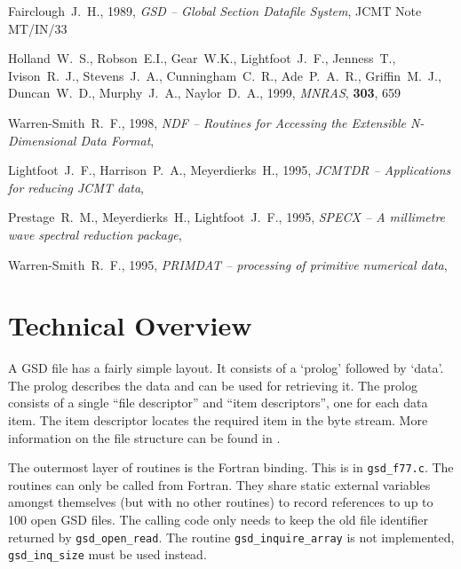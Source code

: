 \documentclass[oneside,11pt]{starlink}
\begin{document}
\begin{thebibliography}{}

Fairclough~J.~H., 1989, {\it GSD -- Global Section Datafile System},
JCMT Note MT/IN/33

Holland~W.~S., Robson~E.I., Gear~W.K., Lightfoot~J.~F., Jenness~T.,
Ivison~R.~J., Stevens~J.~A., Cunningham~C.~R., Ade~P.~A.~R.,
Griffin~M.~J., Duncan~W.~D., Murphy~J.~A., Naylor~D.~A., 1999,
\textit{MNRAS}, \textbf{303}, 659

Warren-Smith~R.~F., 1998, {\it NDF -- Routines for Accessing the Extensible
N-Dimensional Data Format}, 

Lightfoot~J.~F., Harrison~P.~A., Meyerdierks~H., 1995,
{\it JCMTDR -- Applications for reducing JCMT data},

Prestage~R.~M., Meyerdierks~H., Lightfoot~J.~F., 1995, {\it SPECX -- A
millimetre wave spectral reduction package},

Warren-Smith~R.~F., 1995, {\it PRIMDAT -- processing of primitive numerical
data}, 

\end{thebibliography}


\appendix

\section{Technical Overview}

A GSD file has a fairly simple layout. It consists of a `prolog' followed by
`data'. The prolog describes the data and can be used for retrieving it.  The
prolog consists of a single ``file descriptor'' and ``item descriptors'', one
for each data item. The item descriptor locates the required item in the byte
stream. More information on the file structure can be found in \cite{F89}.

The outermost layer of routines is the Fortran binding. This is in
\texttt{gsd\_f77.c}. The routines can only be called from Fortran. They share
static external variables amongst themselves (but with no other routines) to
record references to up to 100 open GSD files. The calling code only needs to
keep the old file identifier returned by \texttt{gsd\_open\_read}. The routine
\texttt{gsd\_inquire\_array} is not implemented, \texttt{gsd\_inq\_size} must
be used instead.
\end{document}
